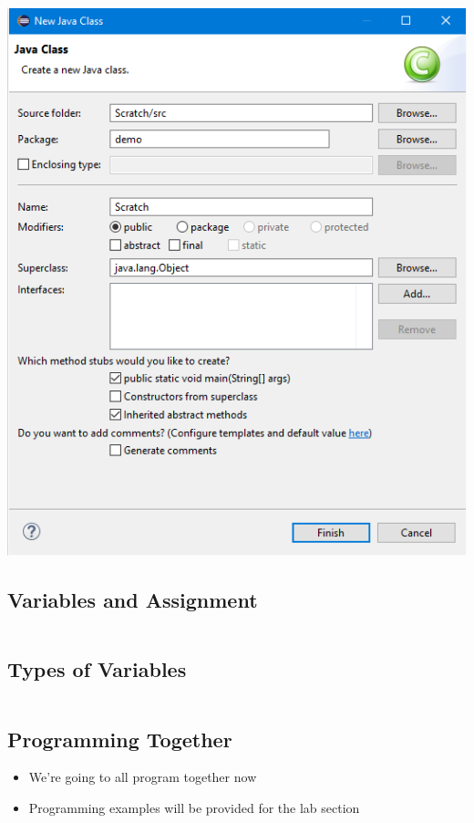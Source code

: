 \documentclass[
paper=128mm:96mm,
fontsize=12pt,
pagesize,
parskip=half-,
]{scrartcl}
\newcommand{\slide}[1]{#1 \clearpage}
\newcommand{\subsectionslide}[2]{\vspace*{1em}\slide{\subsection{#1} #2}}
\begin{document}
	\includegraphics[height=0.8\textheight]{gfx/newjavaclass.png}
	
	\subsectionslide{Variables and Assignment}
	{
		\vspace*{2em}
		\inputminted{java}{code-snippets/variables.java}
	}
	
	\subsectionslide{Types of Variables}
	{
		\vspace*{2em}
		\inputminted{java}{code-snippets/types.java}
	}
	
	\subsectionslide{Programming Together}
	{
		\begin{itemize}
			\item We're going to all program together now
			\item Programming examples will be provided for the lab section
		\end{itemize}

	}
	
\end{document}
